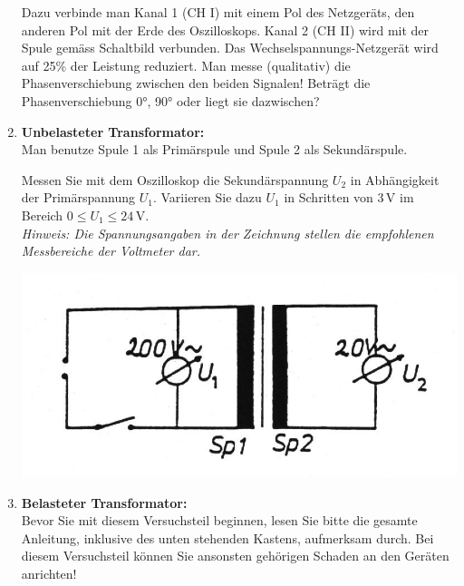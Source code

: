\begin{enumerate}
		Dazu verbinde man Kanal 1 (CH I) mit einem Pol des Netzgeräts, den anderen Pol mit der Erde des Oszilloskops. Kanal 2 (CH II) wird mit der Spule gemäss Schaltbild verbunden. Das Wechselspannungs-Netzgerät wird auf 25\% 
		der Leistung reduziert. Man messe (qualitativ) die Phasenverschiebung zwischen den beiden Signalen! Beträgt die Phasenverschiebung 0°, 90° oder liegt sie dazwischen?
	\item \textbf{Unbelasteter Transformator:}\\ 
		Man benutze Spule 1 als Primärspule und Spule 2 als Sekundärspule.\\
		\begin{minipage}{0.55\textwidth}
			Messen Sie mit dem Oszilloskop die Sekundärspannung $U_2$ in Abhängigkeit der Primärspannung $U_1$. Variieren Sie dazu $U_1$ in Schritten von 3\,V im Bereich $0\leq U_1\leq 24$\,V.\\
			\textit{Hinweis: Die Spannungsangaben in der Zeichnung stellen die empfohlenen Messbereiche der Voltmeter dar.}
		\end{minipage}
		\begin{minipage}{0.45\textwidth}
			\includegraphics[width=\textwidth]{Abbildungen/BILD20.jpg}
			\label{fig:Bild20}
		\end{minipage}
	\item \textbf{Belasteter Transformator:}\\
	Bevor Sie mit diesem Versuchsteil beginnen, lesen Sie bitte die gesamte Anleitung, inklusive des unten stehenden Kastens, aufmerksam durch. Bei diesem Versuchsteil können Sie ansonsten gehörigen Schaden an den Geräten anrichten!\\
	

\end{enumerate}
